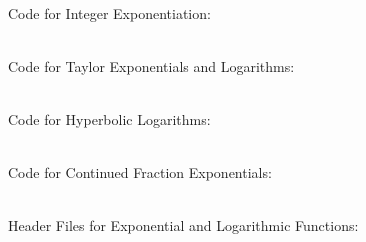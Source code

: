 \\Code for Integer Exponentiation:


\\Code for Taylor Exponentials and Logarithms:


\\Code for Hyperbolic Logarithms:


\\Code for Continued Fraction Exponentials:


\\Header Files for Exponential and Logarithmic Functions:




